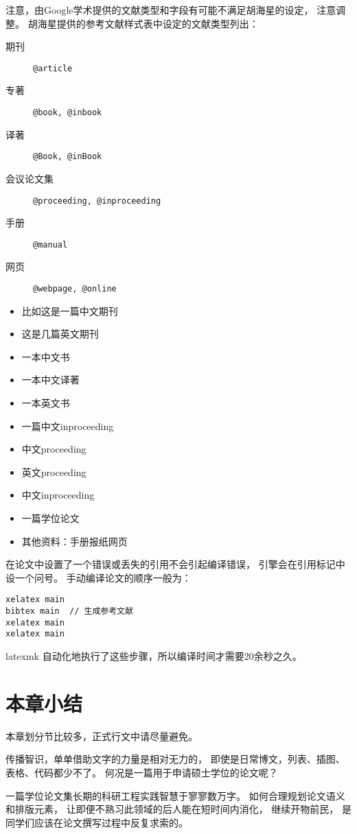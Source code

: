 注意，由Google学术提供的文献类型和字段有可能不满足胡海星的设定，
注意调整。
胡海星提供的参考文献样式表中设定的文献类型列出：
\begin{description}
    \item[期刊]          \texttt{@article}
    \item[专著]          \texttt{@book, @inbook}
    \item[译著]          \texttt{@Book, @inBook}
    \item[会议论文集]    \texttt{@proceeding, @inproceeding}
    \item[手册]          \texttt{@manual}
    \item[网页]          \texttt{@webpage, @online}
\end{description}

\begin{itemize}
    \item 比如这是一篇中文期刊\cite{lixiaodong1999}
    \item 这是几篇英文期刊\cite{christine1998, kanamori1998}
    \item 一本中文书\cite{zh-book-1}
    \item 一本中文译著\cite{anwen1988b}
    \item 一本英文书\cite{lamport1994latex, takeuti1973}
    \item 一篇中文inproceeding\cite{nonlinear1996}
    \item 中文proceeding\cite{a2-1}
    \item 英文proceeding\cite{a2-2}
    \item 中文inproceeding\cite{aczel1998}
    \item 一篇学位论文\cite{a4-1} 
    \item 其他资料：手册\cite{ipad}报纸\cite{renminribao}网页\cite{dubash2010}
\end{itemize}

在论文中设置了一个错误或丢失的引用不会引起编译错误，
引擎会在引用标记中设一个问号。
手动编译论文的顺序一般为：
\begin{verbatim}
xelatex main
bibtex main  // 生成参考文献
xelatex main
xelatex main
\end{verbatim}
latexmk 自动化地执行了这些步骤，所以编译时间才需要20余秒之久。

\section{本章小结}

本章划分节比较多，正式行文中请尽量避免。

传播智识，单单借助文字的力量是相对无力的，
即使是日常博文，列表、插图、表格、代码都少不了。
何况是一篇用于申请硕士学位的论文呢？

一篇学位论文集长期的科研工程实践智慧于寥寥数万字。
如何合理规划论文语义和排版元素，
让即便不熟习此领域的后人能在短时间内消化，
继续开物前民，
是同学们应该在论文撰写过程中反复求索的。


